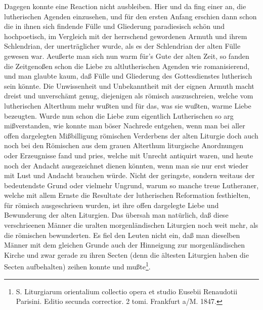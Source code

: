 Dagegen konnte eine Reaction nicht ausbleiben. Hier und da fing einer an, die lutherischen Agenden einzusehen, und für den ersten Anfang erschien dann schon die in ihnen sich findende Fülle und Gliederung paradiesisch schön und hochpoetisch, im Vergleich mit der herrschend gewordenen Armuth und ihrem Schlendrian, der unerträglicher wurde, als es der Schlendrian der alten Fülle gewesen war. Aeußerte man sich nun warm für’s Gute der alten Zeit, so fanden die Zeitgenoßen schon die Liebe zu altlutherischen Agenden wie romanisierend, und man glaubte kaum, daß Fülle und Gliederung des Gottesdienstes lutherisch sein könnte. Die Unwissenheit und Unbekanntheit mit der eignen Armuth macht dreist und unverschämt genug, diejenigen als römisch auszuschreien, welche vom lutherischen Alterthum mehr wußten und für das, was sie wußten, warme Liebe bezeugten. Wurde nun schon die Liebe zum eigentlich Lutherischen so arg mißverstanden, wie konnte man böser Nachrede entgehen, wenn man bei aller offen dargelegten Mißbilligung römischen Verderbens der alten Liturgie doch auch noch bei den Römischen aus dem grauen Alterthum liturgische Anordnungen oder Erzeugnisse fand und pries, welche mit Unrecht antiquirt waren, und heute noch der Andacht ausgezeichnet dienen könnten, wenn man sie nur erst wieder mit Lust und Andacht brauchen würde. Nicht der geringste, sondern weitaus der bedeutendste Grund oder vielmehr Ungrund, warum so manche treue Lutheraner, welche mit allem
Ernste die Resultate der lutherischen Reformation festhielten, für römisch ausgeschrieen wurden, ist ihre offen dargelegte Liebe und Bewunderung der alten Liturgien. Das übersah man natürlich, daß diese verschrieenen Männer die uralten morgenländischen Liturgien noch weit mehr, als die römischen bewunderten. Es fiel den Leuten nicht ein, daß man dieselben Männer mit dem gleichen Grunde auch der Hinneigung zur morgenländischen Kirche und zwar gerade zu ihren Secten (denn die ältesten Liturgien haben die Secten aufbehalten) zeihen konnte und mußte\footnote{S. Liturgiarum orientalium collectio opera et studio Eusebii Renaudotii Parisini. Editio secunda correctior. 2 tomi. Frankfurt a/M. 1847.}.

